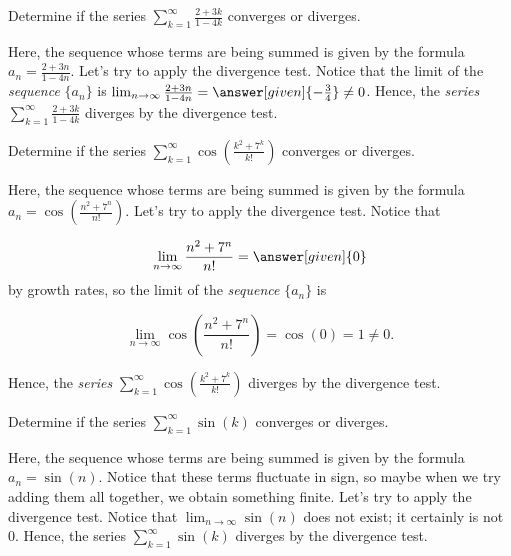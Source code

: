 \documentclass{ximera}
\begin{document}
\begin{example}
Determine if the series $\sum_{k=1}^{\infty} \frac{2+3k}{1-4k}$ converges or diverges.

\begin{explanation}
Here, the sequence whose terms are being summed is given by the formula $a_n = \frac{2+3n}{1-4n}$.  Let's try to apply the divergence test.  Notice that the limit of the \emph{sequence} $\{a_n\}$ is $\lim_{n \to \infty} \frac{2+3n}{1-4n} = \answer[given]{-\frac{3}{4}} \neq 0$.  Hence, the \emph{series} $\sum_{k=1}^{\infty} \frac{2+3k}{1-4k}$ diverges by the divergence test.

\end{explanation}
\end{example}


\begin{example}
Determine if the series $\sum_{k=1}^{\infty} \cos\left(\frac{k^2+7^k}{k!} \right)$ converges or diverges.

\begin{explanation}
Here, the sequence whose terms are being summed is given by the formula $a_n =\cos\left(\frac{n^2+7^n}{n!} \right)$.  Let's try to apply the divergence test.  Notice that

\[
\lim_{n \to \infty} \frac{n^2+7^n}{n!} = \answer[given]{0}
\]
by growth rates, so the limit of the \emph{sequence} $\{a_n\}$ is

\[\lim_{n \to \infty} \cos\left(\frac{n^2+7^n}{n!} \right) = \cos(0) = 1 \neq 0.\]
  
Hence, the \emph{series} $\sum_{k=1}^{\infty} \cos\left(\frac{k^2+7^k}{k!} \right)$ diverges by the divergence test.
\end{explanation}
\end{example}

\begin{example}
Determine if the series $\sum_{k=1}^{\infty} \sin(k)$ converges or diverges.

\begin{explanation}
Here, the sequence whose terms are being summed is given by the formula $a_n =\sin(n)$.  Notice that these terms fluctuate in sign, so maybe when we try adding them all together, we obtain something finite.  Let's try to apply the divergence test.  Notice that $\lim_{n \to \infty} \sin(n)$ does not exist; it certainly is not 0. Hence, the series $\sum_{k=1}^{\infty} \sin(k)$ diverges by the divergence test.
\end{explanation}
\end{example}
\end{document}
